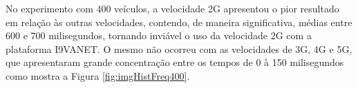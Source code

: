 \documentclass[
	12pt,				%
	oneside,			%
	a4paper,			%
	english,			%
	brazil				%
	]{abntex2ppgsi}
\begin{document}
\begin{figure}[h!]
{		\label{fig:imgGraficoFreq4g200}
	}	
\end{figure}

No experimento com 400 veículos,  a velocidade 2G apresentou o pior resultado em relação às outras velocidades, contendo, de maneira significativa, médias entre 600 e 700 milisegundos, tornando inviável o uso da velocidade 2G com a plataforma I9VANET. O mesmo não ocorreu  com as velocidades de 3G, 4G e 5G, que apresentaram grande concentração entre os tempos de 0 à 150 milisegundos como mostra a Figura \ref{fig:imgHistFreq400}.
\end{document}
